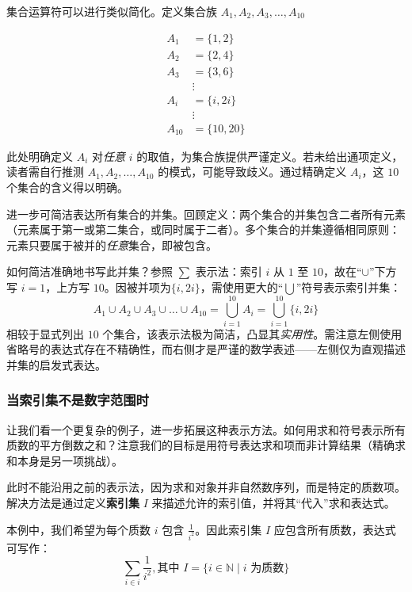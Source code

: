 \begin{example}\label{ex:example3.6.8}
    集合运算符可以进行类似简化。定义集合族 $A_1, A_2, A_3, \dots, A_{10}$
    
    \begin{align*}
        A_1 &= \{1, 2\} \\
        A_2 &= \{2, 4\} \\
        A_3 &= \{3, 6\} \\
        &\vdots \\
        A_i &= \{i, 2i\} \\
        &\vdots \\
        A_{10} &= \{10, 20\}
    \end{align*}

    此处明确定义 $A_i$ 对\emph{任意} $i$ 的取值，为集合族提供严谨定义。若未给出通项定义，读者需自行推测 $A_1,A_2,\dots,A_{10}$ 的模式，可能导致歧义。通过精确定义 $A_i$，这 $10$ 个集合的含义得以明确。

    进一步可简洁表达所有集合的并集。回顾定义：两个集合的并集包含二者所有元素（元素属于第一或第二集合，或同时属于二者）。多个集合的并集遵循相同原则：元素只要属于被并的\emph{任意}集合，即被包含。

    如何简洁准确地书写此并集？参照 $\sum$ 表示法：索引 $i$ 从 $1$ 至 $10$，故在``$\cup$''下方写 $i=1$，上方写 $10$。因被并项为$\{i, 2i\}$，需使用更大的``$\bigcup$''符号表示索引并集：
    \[A_1 \cup A_2 \cup A_3 \cup \dots \cup A_{10} = \bigcup_{i=1}^{10}A_i=\bigcup_{i=1}^{10}\{i, 2i\}\]
    相较于显式列出 $10$ 个集合，该表示法极为简洁，凸显其\emph{实用性}。需注意左侧使用省略号的表达式存在不精确性，而右侧才是严谨的数学表述——左侧仅为直观描述并集的启发式表达。
\end{example}

\subsubsection*{当索引集不是数字范围时}

让我们看一个更复杂的例子，进一步拓展这种表示方法。如何用求和符号表示所有质数的平方倒数之和？注意我们的目标是用符号表达求和项而非计算结果（精确求和本身是另一项挑战）。

此时不能沿用之前的表示法，因为求和对象并非自然数序列，而是特定的质数项。解决方法是通过定义\textbf{索引集} $I$ 来描述允许的索引值，并将其``代入''求和表达式。

本例中，我们希望为每个质数 $i$ 包含 $\frac{1}{i^2}$。因此索引集 $I$ 应包含所有质数，表达式可写作：
\[\sum_{i \in i}\frac{1}{i^2}, \text{其中\ } I = \{i \in \mathbb{N} \mid i \text{\ 为质数}\}\]

